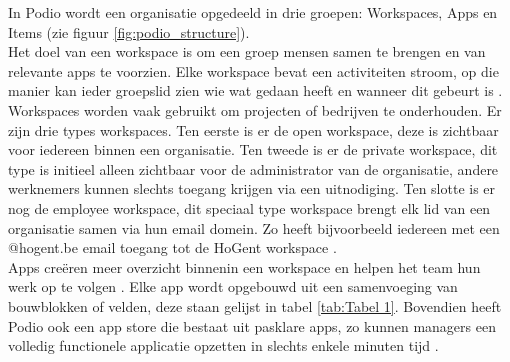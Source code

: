In Podio wordt een organisatie opgedeeld in drie groepen: Workspaces, Apps en Items (zie figuur \ref{fig:podio_structure}). \\

Het doel van een workspace is om een groep mensen samen te brengen en van relevante apps te voorzien. Elke workspace bevat een activiteiten stroom, op die manier kan ieder groepslid zien wie wat gedaan heeft en wanneer dit gebeurt is \autocite{TallyfyPodio}. Workspaces worden vaak gebruikt om projecten of bedrijven te onderhouden. Er zijn drie types workspaces. Ten eerste is er de open workspace, deze is zichtbaar voor iedereen binnen een organisatie. Ten tweede is er de private workspace, dit type is initieel alleen zichtbaar voor de administrator van de organisatie, andere werknemers kunnen slechts toegang krijgen via een uitnodiging. Ten slotte is er nog de employee workspace, dit speciaal type workspace brengt elk lid van een organisatie samen via hun email domein. Zo heeft bijvoorbeeld iedereen met een @hogent.be email toegang tot de HoGent workspace \autocite{PodioFeatures}. \\

Apps creëren meer overzicht binnenin een workspace en helpen het team hun werk op te volgen \autocite{PodioFeatures}. Elke app wordt opgebouwd uit een samenvoeging van bouwblokken of velden, deze staan gelijst in tabel \ref{tab:Tabel 1}. Bovendien heeft Podio ook een app store die bestaat uit pasklare apps, zo kunnen managers een volledig functionele applicatie opzetten in slechts enkele minuten tijd \autocite{TallyfyPodio}. \\

